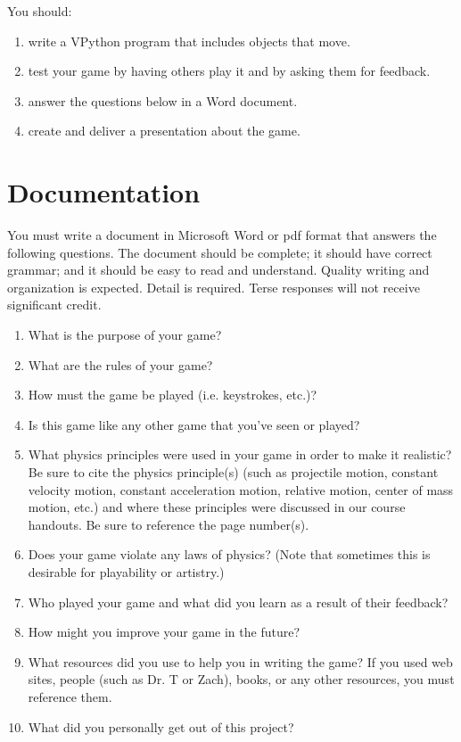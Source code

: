 \noindent
You should:

\begin{enumerate}
	\item write a VPython program that includes objects that move.
	\item test your game by having others play it and by asking them for feedback.
	\item answer the questions below in a Word document.
	\item create and deliver a presentation about the game.
\end{enumerate}

\section*{Documentation}

You must write a document in Microsoft Word or pdf format that answers the following questions. The document should be complete; it should have correct grammar; and it should be easy to read and understand. Quality writing and organization is expected. Detail is required. Terse responses will not receive significant credit. 

\begin{enumerate}
	\item What is the purpose of your game?
	\item What are the rules of your game?
	\item How must the game be played (i.e. keystrokes, etc.)?
	\item Is this game like any other game that you've seen or played?
	\item What physics principles were used in your game in order to make it realistic?  Be sure to cite the physics principle(s) (such as projectile motion, constant velocity motion, constant acceleration motion, relative motion, center of mass motion, etc.) and where these principles were discussed in our course handouts. Be sure to reference the page number(s).
	\item Does your game violate any laws of physics? (Note that sometimes this is desirable for playability or artistry.)
	\item Who played your game and what did you learn as a result of their feedback?
	\item How might you improve your game in the future?
	\item What resources did you use to help you in writing the game?  If you used web sites, people (such as Dr. T or Zach), books, or any other resources, you must reference them.
	\item What did you personally get out of this project?
\end{enumerate}

